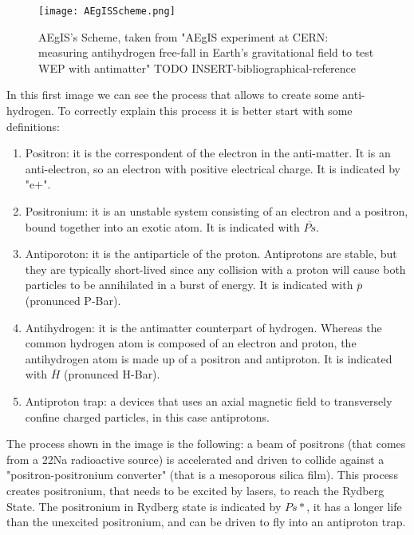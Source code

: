 \begin{figure}[H]
\centering
\texttt{[image: AEgISScheme.png]} 
\caption{AEgIS's Scheme, taken from "AEgIS experiment at CERN: measuring antihydrogen free-fall in Earth’s gravitational field to test WEP with antimatter" TODO INSERT-bibliographical-reference}
\end{figure}

In this first image we can see the process that allows to create some anti-hydrogen. To correctly explain this process it is better start with some definitions:


\begin{enumerate}

\item Positron: it is the correspondent of the electron in the anti-matter. It is an anti-electron, so an electron with positive electrical charge. It is indicated by "e+".

\item Positronium: it is an unstable system consisting of an electron and a positron, bound together into an exotic atom. It is indicated with $ \overline{Ps} $.

\item Antiporoton: it is the antiparticle of the proton. Antiprotons are stable, but they are typically short-lived since any collision with a proton will cause both particles to be annihilated in a burst of energy. It is indicated with $ \overline{p} $ (pronunced P-Bar).

\item Antihydrogen: it is the antimatter counterpart of hydrogen. Whereas the common hydrogen atom is composed of an electron and proton, the antihydrogen atom is made up of a positron and antiproton. It is indicated with $ \overline{H} $ (pronunced H-Bar).


\item Antiproton trap: a devices that uses an axial magnetic field to transversely confine charged particles, in this case antiprotons.


\end{enumerate}

The process shown in the image is the following: a beam of positrons (that comes from a 22Na radioactive source) is accelerated and driven to collide against a "positron-positronium converter" (that is a mesoporous silica film). This process creates positronium, that needs to be excited by lasers, to reach the Rydberg State. The positronium in Rydberg state is indicated by $ {Ps*} $, it has a longer life than the unexcited positronium, and can be driven to fly into an antiproton trap.

